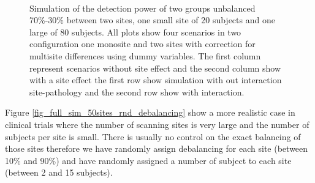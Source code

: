 \documentclass[authoryear]{elsarticle}
\begin{document}
\begin{figure}[tbp]
     \\
     \caption{
     Simulation of the detection power of two groups unbalanced 70\%-30\% between two sites, one small site of 20 subjects and one large of 80 subjects. All plots show four scenarios in two configuration one monosite and two sites with correction for multisite differences using dummy variables. The first column represent scenarios without site effect and the second column show with a site effect the first row show simulation with out interaction site-pathology and the second row show with interaction.
}
     \label{fig_full_sim_2sites_debalancing_inv}
 \end{figure}
 
Figure \ref{fig_full_sim_50sites_rnd_debalancing} show a more realistic case in clinical trials where the number of scanning sites is very large and the number of subjects per site is small. There is usually no control on the exact balancing of those sites therefore we have randomly assign debalancing for each site (between 10\% and 90\%) and have randomly assigned a number of subject to each site (between 2 and 15 subjects).
\end{document}
